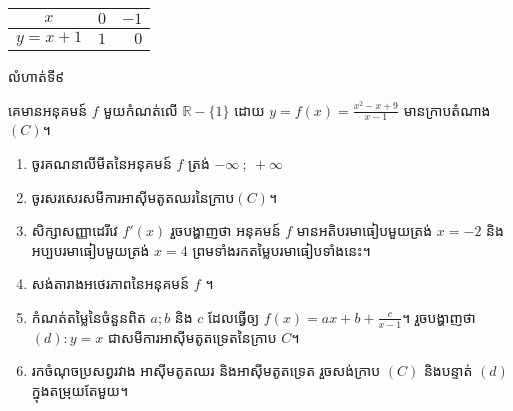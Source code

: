 \documentclass[expologarit]{subfiles}
\begin{document}
\begin{enumerate}[k]
\begin{itemize}
\begin{tabular}{c|rr}
            $ x $& $0$ & $-1$\\ \hline
            $  y=x+1$ & $1$ & $ 0$
             \end{tabular} 
\end{itemize}
\begin{center}
 \end{center}
\end{enumerate}
\newpage 
\begin{center}
\color{violet} \kml លំហាត់ទី៩
\end{center}
គេមានអនុគមន៍ $f$ មួយកំណត់លើ $\mathbb{R}-\{1\}$ ដោយ $y=f(x)=\frac{x^2-x+9}{x-1}$ មានក្រាបតំណាង$(C)$។
\begin{enumerate}[k]
\item ចូរគណនាលីមីតនៃអនុគមន៍ $f$ ត្រង់ $-\infty\ ;\ +\infty\ $
\item ចូរសរសេរសមីការអាស៊ីមតូតឈរនៃក្រាប$(C)$។
\item សិក្សាសញ្ញាដេរីវេ $f'(x)$ រួចបង្ហាញថា អនុគមន៍ $f$ មានអតិបរមាធៀបមួយត្រង់ $x=-2$ និង អប្បបរមាធៀបមួយត្រង់ $x=4$ ព្រមទាំងរកតម្លៃបរមាធៀបទាំងនេះ។
\item សង់តារាងអថេរភាពនៃអនុគមន៍ $f$ ។
\item កំណត់តម្លៃនៃចំនួនពិត $a;b$ និង $c$ ដែលធ្វើឲ្យ $f(x)=ax+b+\frac{c}{x-1}$។ រួចបង្ហាញថា $(d): y=x$  ជាសមីការអាស៊ីមតូតទ្រេតនៃក្រាប $C$។
\item រកចំណុចប្រសព្វរវាង អាស៊ីមតូតឈរ និងអាស៊ីមតូតទ្រេត រួចសង់ក្រាប $(C)$ និងបន្ទាត់ $(d)$ ក្នុងតម្រុយតែមួយ។
\end{enumerate}
\end{document}
